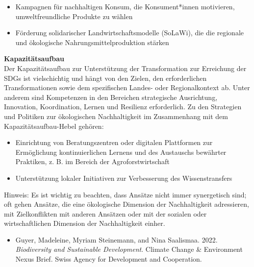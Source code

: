 \documentclass[
  nswissgerman,
  a4paper,
  DIV=11,
  numbers=noendperiod,
  oneside,
  openany]{scrreprt}
\providecommand{\tightlist}{%
  \setlength{\itemsep}{0pt}\setlength{\parskip}{0pt}}
\begin{document}
\begin{itemize}
\item
  Kampagnen für nachhaltigen Konsum, die Konsument*innen motivieren,
  umweltfreundliche Produkte zu wählen
\item
  Förderung solidarischer Landwirtschaftsmodelle (SoLaWi), die die
  regionale und ökologische Nahrungsmittelproduktion stärken
\end{itemize}

\textbf{Kapazitätsaufbau}\\
Der Kapazitätsaufbau zur Unterstützung der Transformation zur Erreichung
der SDGs ist vielschichtig und hängt von den Zielen, den erforderlichen
Transformationen sowie dem spezifischen Landes- oder Regionalkontext ab.
Unter anderem sind Kompetenzen in den Bereichen strategische
Ausrichtung, Innovation, Koordination, Lernen und Resilienz
erforderlich. Zu den Strategien und Politiken zur ökologischen
Nachhaltigkeit im Zusammenhang mit dem Kapazitätsaufbau-Hebel gehören:

\begin{itemize}
\item
  Einrichtung von Beratungszentren oder digitalen Plattformen zur
  Ermöglichung kontinuierlichen Lernens und des Austauschs bewährter
  Praktiken, z. B. im Bereich der Agroforstwirtschaft
\item
  Unterstützung lokaler Initiativen zur Verbesserung des
  Wissenstransfers
\end{itemize}

Hinweis: Es ist wichtig zu beachten, dass Ansätze nicht immer
synergetisch sind; oft gehen Ansätze, die eine ökologische Dimension der
Nachhaltigkeit adressieren, mit Zielkonflikten mit anderen Ansätzen oder
mit der sozialen oder wirtschaftlichen Dimension der Nachhaltigkeit
einher.

\begin{tcolorbox}[enhanced jigsaw, arc=.35mm, bottomrule=.15mm, bottomtitle=1mm, breakable, colback=white, colbacktitle=quarto-callout-caution-color!10!white, colframe=quarto-callout-caution-color-frame, coltitle=black, left=2mm, leftrule=.75mm, opacityback=0, opacitybacktitle=0.6, rightrule=.15mm, title={Weiterführende Literatur}, titlerule=0mm, toprule=.15mm, toptitle=1mm]

\begin{itemize}
\tightlist
\item
  Guyer, Madeleine, Myriam Steinemann, and Nina Saalismaa. 2022.
  \emph{Biodiversity and Sustainable Development}. Climate Change \&
  Environment Nexus Brief. Swiss Agency for Development and Cooperation.
\end{itemize}

\end{tcolorbox}
\end{document}
